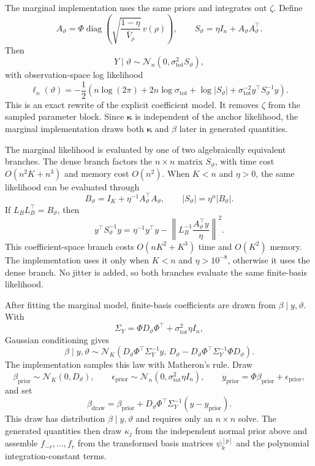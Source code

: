\documentclass[11pt,a4paper]{article}
\theoremstyle{definition}
\theoremstyle{remark}
\DeclareMathOperator{\diag}{diag}
\begin{document}
The marginal implementation uses the same priors and integrates out \(\zeta\). Define
\[
A_\vartheta
=
\Phi\diag\left(\sqrt{\frac{1-\eta}{\bar V_\rho}}\,v(\rho)\right),
\qquad
S_\vartheta=\eta I_n+A_\vartheta A_\vartheta^\top .
\]
Then
\[
Y\mid\vartheta
\sim
\mathcal N_n(0,\sigma_{\mathrm{tot}}^2S_\vartheta),
\]
with observation-space log likelihood
\[
\ell_n(\vartheta)
=
-\frac12\left(
n\log(2\pi)
+2n\log\sigma_{\mathrm{tot}}
+\log |S_\vartheta|
+\sigma_{\mathrm{tot}}^{-2}y^\top S_\vartheta^{-1}y
\right).
\]
This is an exact rewrite of the explicit coefficient model. It removes \(\zeta\) from the sampled parameter block. Since \(\boldsymbol\kappa\) is independent of the anchor likelihood, the marginal implementation draws both \(\boldsymbol\kappa\) and \(\beta\) later in generated quantities.

The marginal likelihood is evaluated by one of two algebraically equivalent branches.
The dense branch factors the \(n\times n\) matrix \(S_\vartheta\), with time cost \(O(n^2K+n^3)\) and memory cost \(O(n^2)\). When \(K<n\) and \(\eta>0\), the same likelihood can be evaluated through
\[
B_\vartheta=I_K+\eta^{-1}A_\vartheta^\top A_\vartheta,
\qquad
|S_\vartheta|=\eta^n|B_\vartheta|.
\]
If \(L_B L_B^\top=B_\vartheta\), then
\[
y^\top S_\vartheta^{-1}y
=
\eta^{-1}y^\top y
-
\left\|
L_B^{-1}\frac{A_\vartheta^\top y}{\eta}
\right\|^2 .
\]
This coefficient-space branch costs \(O(nK^2+K^3)\) time and \(O(K^2)\) memory. The implementation uses it only when \(K<n\) and \(\eta>10^{-8}\), otherwise it uses the dense branch. No jitter is added, so both branches evaluate the same finite-basis likelihood.

After fitting the marginal model, finite-basis coefficients are drawn from \(\beta\mid y,\vartheta\). With
\[
\Sigma_Y=\Phi D_\vartheta\Phi^\top+\sigma_{\mathrm{tot}}^2\eta I_n,
\]
Gaussian conditioning gives
\[
\beta\mid y,\vartheta
\sim
\mathcal N_K\!\left(
D_\vartheta\Phi^\top\Sigma_Y^{-1}y,\,
D_\vartheta-D_\vartheta\Phi^\top\Sigma_Y^{-1}\Phi D_\vartheta
\right).
\]
The implementation samples this law with Matheron's rule. Draw
\[
\beta_{\mathrm{prior}}\sim\mathcal N_K(0,D_\vartheta),
\qquad
\epsilon_{\mathrm{prior}}\sim\mathcal N_n(0,\sigma_{\mathrm{tot}}^2\eta I_n),
\qquad
y_{\mathrm{prior}}=\Phi\beta_{\mathrm{prior}}+\epsilon_{\mathrm{prior}},
\]
and set
\[
\beta_{\mathrm{draw}}
=
\beta_{\mathrm{prior}}
+D_\vartheta\Phi^\top\Sigma_Y^{-1}(y-y_{\mathrm{prior}}).
\]
This draw has distribution \(\beta\mid y,\vartheta\) and requires only an \(n\times n\) solve. The generated quantities then draw \(\kappa_j\) from the independent normal prior above and assemble \(f_{-r},\ldots,f_r\) from the transformed basis matrices \(\psi_k^{[p]}\) and the polynomial integration-constant terms.
\end{document}
